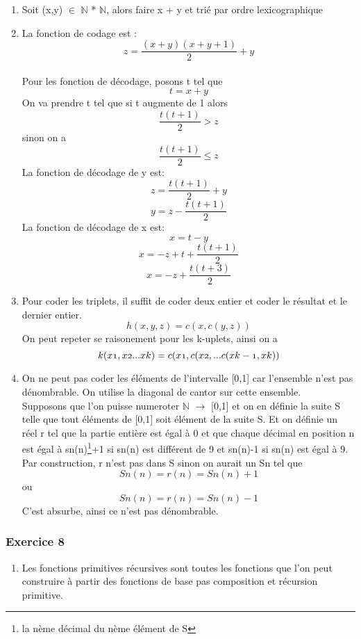 \documentclass{article}
\begin{document}
\begin{enumerate}
\begin{enumerate}
\item Soit (x,y) $\in$ $\mathbb{N}$ * $\mathbb{N}$, alors faire x + y et trié par ordre lexicographique
\item La fonction de codage est : \[z = \frac{(x+y)(x+y+1)}{2} + y\]\\
Pour les fonction de décodage, posons t tel que \[t = x + y\]
On va prendre t tel que si t augmente de 1 alors \[\frac{t(t+1)}{2} > z\] sinon on a \[\frac{t(t+1)}{2} \le z\]
La fonction de décodage de y est: \[z =\frac{t(t+1)}{2} + y\] \[y = z - \frac{t(t+1)}{2}\]
La fonction de décodage de x est: \[x = t - y\] \[x = -z + t + \frac{t(t+1)}{2}\] \[x = -z + \frac{t(t+3)}{2}\]
\item Pour coder les triplets, il suffit de coder deux entier et coder le résultat et le dernier entier. 
  \[h(x,y,z)=c(x , c(y,z))\]
On peut repeter se raisonement pour les k-uplets, ainsi on a 
\[k(x\oldstylenums{1},x\oldstylenums{2}... x\oldstylenums{k}) = c(x\oldstylenums{1} , c(x\oldstylenums{2} , ... c(x\oldstylenums{k-1},x\oldstylenums{k}))\]
\item On ne peut pas coder les éléments de l'intervalle [0,1] car l'ensemble n'est pas dénombrable. On utilise la diagonal de cantor sur cette ensemble.\\
Supposons que l'on puisse numeroter $\mathbb{N}$  $\rightarrow$ [0,1] et on en définie la suite S telle que tout éléments de [0,1] soit élément de la suite S.
Et on définie un réel r tel que la partie entière est égal à 0 et que chaque décimal en position n est égal à sn(n)\footnote{la nème décimal du nème élément de S}+1 si sn(n) est différent de 9 et sn(n)-1 si sn(n) est égal à 9.\\
Par construction, r n'est pas dans S sinon on aurait un Sn tel que \[Sn(n)=r(n)=Sn(n)+1\] ou \[Sn(n)=r(n)=Sn(n)-1\] C'est absurbe, ainsi ce n'est pas dénombrable. 
   
  
\end{enumerate}




\subsubsection{Exercice 8}
\begin{enumerate}
\item Les fonctions primitives récursives sont toutes les fonctions que l'on peut construire à partir des fonctions de base pas composition et récursion primitive.\\


\end{enumerate}
\end{enumerate}
\end{document}
